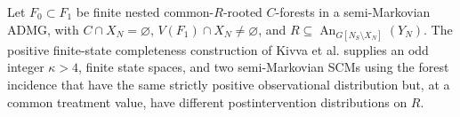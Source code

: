 Let \(F_0\subset F_1\) be finite nested common-\(R\)-rooted \(C\)-forests in a semi-Markovian ADMG, with \(C\cap X_N=\varnothing\), \(V(F_1)\cap X_N\ne\varnothing\), and \(R\subseteq\operatorname{An}_{G[N_S\setminus X_N]}(Y_N)\). The positive finite-state completeness construction of Kivva et al. supplies an odd integer \(\kappa>4\), finite state spaces, and two semi-Markovian SCMs using the forest incidence that have the same strictly positive observational distribution but, at a common treatment value, have different postintervention distributions on \(R\).